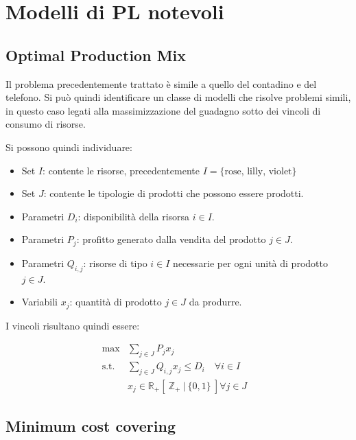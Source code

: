 
\chapter{Modelli di PL notevoli}



\section{Optimal Production Mix}

Il problema precedentemente trattato è simile a quello del contadino e del telefono.
Si può quindi identificare un classe di modelli che risolve problemi simili, in questo caso legati alla massimizzazione del guadagno sotto dei vincoli di consumo di risorse.

Si possono quindi individuare:

\begin{itemize}
	\item Set $I$: contente le risorse, precedentemente $I = \{\text{rose, lilly, violet}\}$
	\item Set $J$: contente le tipologie di prodotti che possono essere prodotti.
	\item Parametri $D_i$: disponibilità della risorsa $i \in I$.
	\item Parametri $P_j$: profitto generato dalla vendita del prodotto $j \in J$.
	\item Parametri $Q_{i,j}$: risorse di tipo $i \in I$ necessarie per ogni unità di prodotto $j \in J$.
	\item Variabili $x_j$: quantità di prodotto $j \in J$ da produrre.
\end{itemize}

I vincoli risultano quindi essere:

\begin{align*}
	\max &\sum\limits_{j \in J} P_j x_j &\\
	\text{s.t. } &\sum\limits_{j \in J} Q_{i,j} x_j \leq D_i \quad \forall i \in I \\
	&x_j \in \mathbb{R}_{+} [\: \mathbb{Z}_{+} \:|\: \{0,1\} \:] \forall j \in J
\end{align*}

\section{Minimum cost covering}


